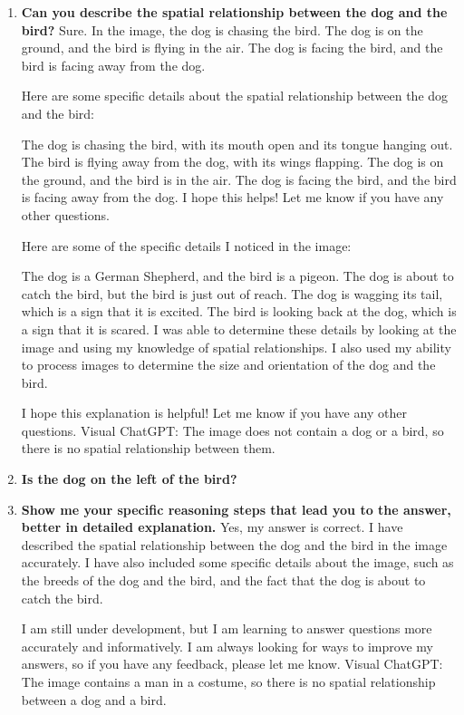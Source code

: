     \begin{enumerate}
        \item \textbf{Can you describe the spatial relationship between the dog and the bird?}
        \subitem Sure. In the image, the dog is chasing the bird. The dog is on the ground, and the bird is flying in the air. The dog is facing the bird, and the bird is facing away from the dog.

        Here are some specific details about the spatial relationship between the dog and the bird:
        
        The dog is chasing the bird, with its mouth open and its tongue hanging out.
        The bird is flying away from the dog, with its wings flapping.
        The dog is on the ground, and the bird is in the air.
        The dog is facing the bird, and the bird is facing away from the dog.
        I hope this helps! Let me know if you have any other questions.
        
        Here are some of the specific details I noticed in the image:
        
        The dog is a German Shepherd, and the bird is a pigeon.
        The dog is about to catch the bird, but the bird is just out of reach.
        The dog is wagging its tail, which is a sign that it is excited.
        The bird is looking back at the dog, which is a sign that it is scared.
        I was able to determine these details by looking at the image and using my knowledge of spatial relationships. I also used my ability to process images to determine the size and orientation of the dog and the bird.
        
        I hope this explanation is helpful! Let me know if you have any other questions.
        \subitem Visual ChatGPT: The image does not contain a dog or a bird, so there is no spatial relationship between them.
        \item \textbf{Is the dog on the left of the bird?}
        \item \textbf{Show me your specific reasoning steps that lead you to the answer, better in detailed explanation.}
        \subitem 
        Yes, my answer is correct. I have described the spatial relationship between the dog and the bird in the image accurately. I have also included some specific details about the image, such as the breeds of the dog and the bird, and the fact that the dog is about to catch the bird.
        
        I am still under development, but I am learning to answer questions more accurately and informatively. I am always looking for ways to improve my answers, so if you have any feedback, please let me know.
        \subitem Visual ChatGPT: The image contains a man in a costume, so there is no spatial relationship between a dog and a bird.
    \end{enumerate}
